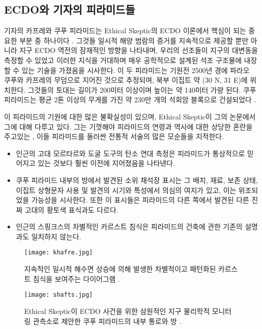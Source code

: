 \documentclass[10pt,twocolumn,letterpaper]{article}
\begin{document}
\begin{개요}
\section{ECDO와 기자의 피라미드들}
기자의 카프레와 쿠푸 피라미드는 Ethical Skeptic의 ECDO 이론에서 핵심이 되는 중요한 부분 중 하나이다 \cite{27}. 그것들 일시적 해양 범람의 증거를 지속적으로 제공할 뿐만 아니라 지구 ECDO 역전의 잠재적인 방향을 나타내며, 우리의 선조들이 지구의 대변동을 측정할 수 있었고 이러한 지식을 거대하며 매우 공학적으로 설계된 석조 구조물에 내장할 수 있는 기술을 가졌음을 시사한다. 이 두 피라미드는 기원전 2500년 경에 파라오 쿠푸와 카프레의 무덤으로 지어진 것으로 추정되며, 북부 이집트 약 (30 N, 31 E)에 위치한다. 그것들의 토대는 길이가 200미터 이상이며 높이는  약 140미터 가량 된다. 쿠푸 피라미드는 평균 2톤 이상의 무게를 가진 약 230만 개의 석회암 블록으로 건설되었다 \cite{24, 25}.

이 피라미드의 기원에 대한 많은 불확실성이 있으며, Ethical Skeptic이 그의 논문에서 그에 대해 다루고 있다. 그는 기껏해야 피라미드의 연령과 역사에 대한 상당한 혼란을 주고있는 , 이들 피라미드를 둘러싼 전통적 서술의 많은 모순들을 지적한다. 

\begin{flushleft}
\begin{itemize}
    \item 인근의  고대 모르타르와 도굴 도구의 탄소 연대 측정은 피라미드가 통상적으로 믿어지고 있는 것보다 훨씬 이전에 지어졌음을 나타낸다.
    \item 쿠푸 피라미드 내부의 방에서 발견된 소위 채석장 표시는 그 배치, 재료, 보존 상태, 이집트 상형문자 사용 및 발견의 시기와 특성에서 의심의 여지가 있고, 이는 위조되었을 가능성을 시사한다. 또한 이 표시들은 피라미드의 다른 
    쪽에서 발견된 다른 진짜 고대의 황토색 표식과도 다르다.
    \item 인근의 스핑크스의 차별적인 카르스트 침식은 피라미드의  건축에 관한  기존의 설명과도 일치하지 않는다.
\end{itemize}
\end{flushleft}

\begin{figure*}[t]
\begin{center}
\texttt{[image: khafre.jpg]}
\end{center}
   \caption{지속적인 일시적 해수면 상승에 의해 발생한 차별적이고 패턴화된 카르스트 침식을 보여주는 다이어그램 \cite{27}.}
\label{fig:4}
\end{figure*}

\begin{figure*}[t]
\begin{center}
\texttt{[image: shafts.jpg]}
\end{center}
   \caption{Ethical Skeptic이 ECDO 사건을 위한 삼원적인 지구 물리학적 모니터링 관측소로 제안한 쿠푸 피라미드의 내부 통로와 방 \cite{28}.}
\label{fig:5}
\end{figure*}


\end{개요}
\end{document}
